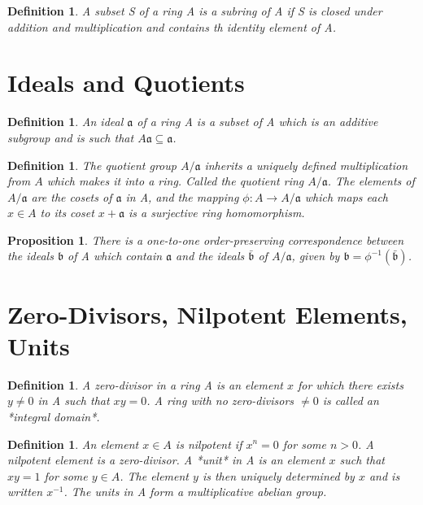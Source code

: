\documentclass[]{report}
\newtheorem{prop}[theorem]{Proposition}
\newtheorem{defn}[theorem]{Definition}
\begin{document}
\begin{defn} A subset S of a ring A is a subring of A if S is closed under addition and multiplication and contains th identity element of A. 
\end{defn}

\section{Ideals and Quotients}
\begin{defn}
    An ideal $\mathfrak{a}$ of a ring A is a subset of A which is an additive subgroup and is such that $A\mathfrak{a\subseteq a}$.
\end{defn}

\begin{defn}
    The quotient group $A/\mathfrak{a}$ inherits a uniquely defined multiplication from $A$ which makes it into a ring. Called the quotient ring $A/\mathfrak{a}$. The elements of $A/\mathfrak{a}$ are the cosets of $\mathfrak{a}$ in A, and the mapping $\phi: A\rightarrow A/\mathfrak{a}$ which maps each $x\in A$ to its coset $x+\mathfrak{a}$ is a surjective ring homomorphism.
\end{defn}

\begin{prop}
    There is a one-to-one order-preserving correspondence between the ideals $\mathfrak{b}$ of A which contain $\mathfrak{a}$ and the ideals $\bar{\mathfrak{b}}$  of $A/\mathfrak{a}$, given by $\mathfrak{b} = \phi^{-1}(\bar{\mathfrak{b}})$.
\end{prop}

\section{Zero-Divisors, Nilpotent Elements, Units}

\begin{defn}
    A zero-divisor in a ring A is an element $x$ for which there exists $y\neq 0$ in A such that $xy=0$. A ring with no zero-divisors $\neq 0$ is called an *integral domain*.
\end{defn}

\begin{defn}
    An element $x\in A$ is nilpotent if $x^n=0$ for some $n>0$. A nilpotent element is a zero-divisor. A *unit* in A is an element $x$ such that $xy=1$ for some $y\in A$. The element $y$ is then uniquely determined by $x$ and is written $x^{-1}$. The units in A form a multiplicative abelian group.
\end{defn}
\end{document}
